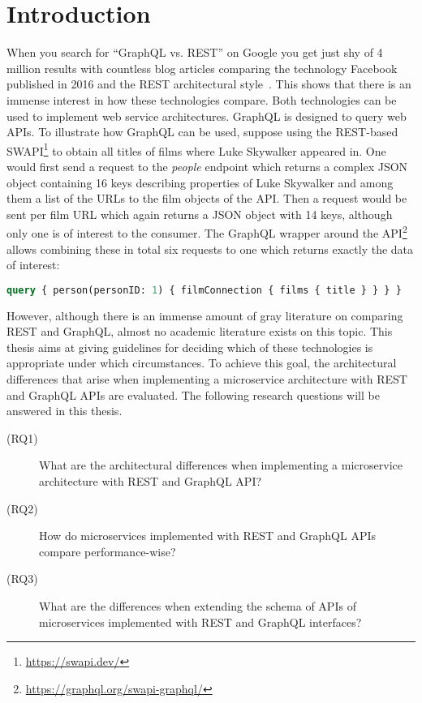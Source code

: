 \section{Introduction}\label{sec:introduction}

When you search for ``GraphQL vs. \acs{REST}'' on Google you get just shy of 4 million results with countless blog articles comparing the technology Facebook published in 2016 and the \acf{REST} architectural style~\cite{Brito2019}.
This shows that there is an immense interest in how these technologies compare.
Both technologies can be used to implement web service architectures.
GraphQL is designed to query web \acp{API}.
To illustrate how GraphQL can be used, suppose using the \ac{REST}-based \ac{SWAPI}\footnote{\url{https://swapi.dev/}} to obtain all titles of films where Luke Skywalker appeared in.
One would first send a request to the \textit{people} endpoint which returns a complex \ac{JSON} object containing 16 keys describing properties of Luke Skywalker and among them a list of the \acp{URL} to the film objects of the \ac{API}.
Then a request would be sent per film \ac{URL} which again returns a \ac{JSON} object with 14 keys, although only one is of interest to the consumer.
The GraphQL wrapper around the \ac{API}\footnote{\url{https://graphql.org/swapi-graphql/}} allows combining these in total six requests to one which returns exactly the data of interest:
\begin{lstlisting}[language=graphql]
query { person(personID: 1) { filmConnection { films { title } } } }
\end{lstlisting}



However, although there is an immense amount of gray literature on comparing \ac{REST} and GraphQL, almost no academic literature exists on this topic.
This thesis aims at giving guidelines for deciding which of these technologies is appropriate under which circumstances.
To achieve this goal, the architectural differences that arise when implementing a microservice architecture with \ac{REST} and GraphQL \acp{API} are evaluated.
The following research questions will be answered in this thesis.

\begin{description}
    \item[(\acs{RQ}1)] What are the architectural differences when implementing a microservice architecture with \ac{REST} and GraphQL \ac{API}?
    \item[(\acs{RQ}2)] How do microservices implemented with \ac{REST} and GraphQL \acp{API} compare performance-wise?
    \item[(\acs{RQ}3)] What are the differences when extending the schema of \acp{API} of microservices implemented with \ac{REST} and GraphQL interfaces?  
\end{description}

